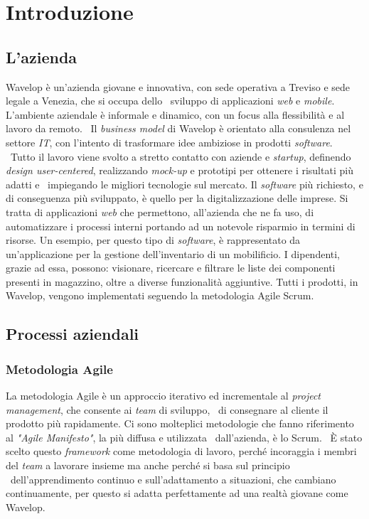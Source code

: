 
\chapter{Introduzione}
\label{cap:intro}
\section{L'azienda}
Wavelop è un'azienda giovane e innovativa, con sede operativa a Treviso e sede legale a Venezia, che si occupa dello \
sviluppo di applicazioni \emph{web} e \emph{mobile}. L'ambiente aziendale è informale e dinamico, con un focus alla flessibilità e al lavoro da remoto. \
Il \emph{business model} di Wavelop è orientato alla consulenza nel settore \emph{IT}, con l'intento di trasformare idee ambiziose in prodotti \emph{software}. \
Tutto il lavoro viene svolto a stretto contatto con aziende e \emph{startup}, definendo \emph{design user-centered}, realizzando \emph{\gls{mock-up}} e prototipi per ottenere i risultati più adatti e \
impiegando le migliori tecnologie sul mercato.
Il \emph{software} più richiesto, e di conseguenza più sviluppato, è quello per la digitalizzazione delle imprese. 
Si tratta di applicazioni \emph{web} che permettono, all'azienda che ne fa uso, di automatizzare i processi interni portando ad un notevole risparmio in termini di risorse.
Un esempio, per questo tipo di \emph{software}, è rappresentato da un'applicazione per la gestione dell'inventario di un mobilificio.
I dipendenti, grazie ad essa, possono: visionare, ricercare e filtrare le liste dei componenti presenti in magazzino, oltre a diverse funzionalità aggiuntive.
Tutti i prodotti, in Wavelop, vengono implementati seguendo la metodologia Agile Scrum.

\section{Processi aziendali}

\subsection{Metodologia Agile}
La metodologia Agile è un approccio iterativo ed incrementale al \emph{project management}, che consente ai \emph{team} di sviluppo, \
di consegnare al cliente il prodotto più rapidamente. Ci sono molteplici metodologie che fanno riferimento al \emph{"Agile Manifesto"}, la più diffusa e utilizzata \
dall'azienda, è lo Scrum. \
È stato scelto questo \emph{framework} come metodologia di lavoro, perché incoraggia i membri del \emph{team} a lavorare insieme ma anche perché si basa sul principio \
dell'apprendimento continuo e sull'adattamento a situazioni, che cambiano continuamente, per questo si adatta perfettamente ad una realtà giovane come Wavelop. \\


